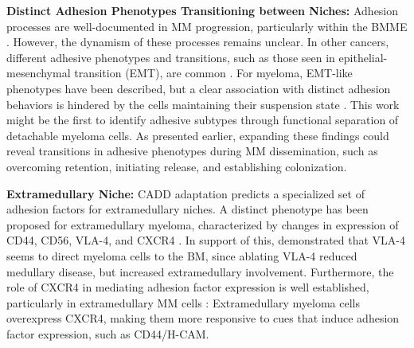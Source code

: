 \textbf{Distinct Adhesion Phenotypes Transitioning between Niches:}
Adhesion processes are well-documented in MM progression, particularly within
the \ac{BMME} \cite{bouzerdanAdhesionMoleculesMultiple2022}. However, the
dynamism of these processes remains unclear. In other cancers, different
adhesive phenotypes and transitions, such as those seen in
epithelial-mesenchymal transition (EMT), are common
\cite{gengDynamicSwitchTwo2014}. For myeloma, EMT-like phenotypes have been
described, but a clear association with distinct adhesion behaviors is hindered
by the cells maintaining their suspension state
\cite{roccaroCXCR4RegulatesExtraMedullary2015,
      qianSETDB1InducesLenalidomide2023}. This work might be the first to identify
adhesive subtypes through functional separation of detachable myeloma cells. As
presented earlier, expanding these findings could reveal transitions in adhesive
phenotypes during MM dissemination, such as overcoming retention, initiating
release, and establishing colonization.


\textbf{Extramedullary Niche:}
\ac{CADD} adaptation predicts a specialized set of adhesion factors for
extramedullary niches. A distinct phenotype has been proposed for extramedullary
myeloma, characterized by changes in
expression of CD44, CD56, VLA-4, and CXCR4
\cite{guptaExtramedullaryMultipleMyeloma2022}. In support of this,
\cite{hathiAblationVLA4Multiple2022} demonstrated that VLA-4 seems to direct
myeloma cells to the BM, since ablating VLA-4 reduced medullary disease, but
increased extramedullary involvement. Furthermore, the role of CXCR4 in
mediating adhesion factor expression is well established, particularly in
extramedullary MM cells \cite{roccaroCXCR4RegulatesExtraMedullary2015,
guptaExtramedullaryMultipleMyeloma2022}: Extramedullary myeloma cells
overexpress CXCR4, making them more responsive to cues that induce adhesion
factor expression, such as CD44/H-CAM.



